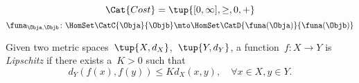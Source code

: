 {\begin{forslides}
\begin{equation*}
            \Cat{Cost}=\tup{[0,\infty], \geq, 0, +}
        \end{equation*}
        \begin{equation*}
            \label{eq:enriched_fun_a}
            \funa_{\Obja, \Objb} \colon \HomSet\CatC{\Obja}{\Objb} \mto \HomSet\CatD{\funa(\Obja)}{\funa(\Objb)}
        \end{equation*}
        \begin{definition}
            \label{def:cost_enrich_a}
            Given two metric spaces~$\tup{X,d_X}$,~$\tup{Y,d_Y}$, a function~$f\colon X\to Y$ is \emph{Lipschitz} if there exists a~$K>0$ such that
            \begin{equation}
                d_Y(f(x),f(y))\leq Kd_X(x,y),\quad \forall x\in X,y\in Y.
            \end{equation}
        \end{definition}
    \end{forslides}
}

